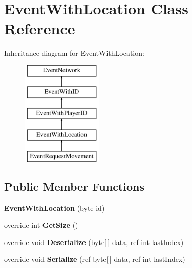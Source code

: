\hypertarget{class_event_with_location}{\section{Event\-With\-Location Class Reference}
\label{class_event_with_location}
}
Inheritance diagram for Event\-With\-Location\-:\begin{figure}[H]
\begin{center}
\leavevmode
\includegraphics[height=5.000000cm]{class_event_with_location}
\end{center}
\end{figure}
\subsection*{Public Member Functions}
\begin{DoxyCompactItemize}
\item 
\hypertarget{class_event_with_location_a1771f2cfe61d2fe0e5c2e9c3918f1af0}{{\bfseries Event\-With\-Location} (byte id)}\label{class_event_with_location_a1771f2cfe61d2fe0e5c2e9c3918f1af0}

\item 
\hypertarget{class_event_with_location_a48cf87a98afdcbf70116befc19e6b963}{override int {\bfseries Get\-Size} ()}\label{class_event_with_location_a48cf87a98afdcbf70116befc19e6b963}

\item 
\hypertarget{class_event_with_location_a92c297e15031f8ce26f943cc85289425}{override void {\bfseries Deserialize} (byte\mbox{[}$\,$\mbox{]} data, ref int last\-Index)}\label{class_event_with_location_a92c297e15031f8ce26f943cc85289425}

\item 
\hypertarget{class_event_with_location_a0f019b5b1ca8e1437137d2c93dd2e34a}{override void {\bfseries Serialize} (ref byte\mbox{[}$\,$\mbox{]} data, ref int last\-Index)}\label{class_event_with_location_a0f019b5b1ca8e1437137d2c93dd2e34a}

\end{DoxyCompactItemize}
